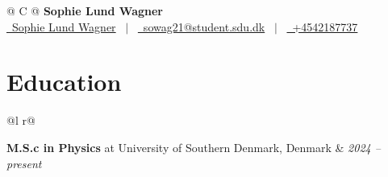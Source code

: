 \documentclass[a4paper, 11pt]{article}
\begin{document}
\onehalfspacing

\pagestyle{empty} 


\begin{tabularx}{\linewidth}{@{} C @{}}%
    \Huge \textbf{Sophie Lund Wagner} \\ [7.5pt]
    \href{https://linkedin.com/in/sophiewagner1999}{\raisebox{-0.05\height}\faLinkedin\ Sophie Lund Wagner} \ $|$ \ 
    \href{mailto:sowag21@student.sdu.dk}{\raisebox{-0.05\height}\faEnvelope \ sowag21@student.sdu.dk} \ $|$ \ 
    \href{tel:+4542187737}{\raisebox{-0.05\height}\faMobile \ +4542187737} \\
\end{tabularx}



\section{Education}
\begin{tabularx}{\linewidth}{@{}l r@{}}	

 \textbf{M.S.c in Physics} at University of Southern Denmark, Denmark & \hfill \textit{2024 -- present} \\ [3.75pt]
\end{tabularx}
\end{document}

